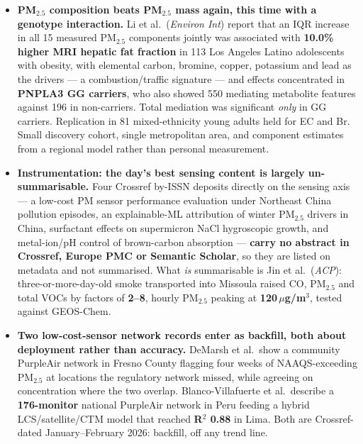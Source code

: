 \documentclass[10pt]{article}
\begin{document}
\begin{itemize}
\item \textbf{PM$_{2.5}$ composition beats PM$_{2.5}$ mass again, this time with a
genotype interaction.} Li et al.\ (\textit{Environ Int}) report that an IQR increase in
all 15 measured PM$_{2.5}$ components jointly was associated with \textbf{10.0\% higher
MRI hepatic fat fraction} in 113 Los Angeles Latino adolescents with obesity, with
elemental carbon, bromine, copper, potassium and lead as the drivers --- a
combustion/traffic signature --- and effects concentrated in \textbf{PNPLA3 GG carriers},
who also showed 550 mediating metabolite features against 196 in non-carriers. Total
mediation was significant \emph{only} in GG carriers. Replication in 81 mixed-ethnicity
young adults held for EC and Br. Small discovery cohort, single metropolitan area, and
component estimates from a regional model rather than personal measurement.

\item \textbf{Instrumentation: the day's best sensing content is largely un-summarisable.}
Four Crossref by-ISSN deposits directly on the sensing axis --- a low-cost PM sensor
performance evaluation under Northeast China pollution episodes, an explainable-ML
attribution of winter PM$_{2.5}$ drivers in China, surfactant effects on supermicron NaCl
hygroscopic growth, and metal-ion/pH control of brown-carbon absorption --- \textbf{carry
no abstract in Crossref, Europe PMC or Semantic Scholar}, so they are listed on metadata
and not summarised. What \emph{is} summarisable is Jin et al.\ (\textit{ACP}):
three-or-more-day-old smoke transported into Missoula raised CO, PM$_{2.5}$ and total VOCs
by factors of \textbf{2--8}, hourly PM$_{2.5}$ peaking at \textbf{120\,$\mu$g/m$^3$},
tested against GEOS-Chem.

\item \textbf{Two low-cost-sensor network records enter as backfill, both about deployment
rather than accuracy.} DeMarsh et al.\ show a community PurpleAir network in Fresno County
flagging four weeks of NAAQS-exceeding PM$_{2.5}$ at locations the regulatory network
missed, while agreeing on concentration where the two overlap. Blanco-Villafuerte et al.\
describe a \textbf{176-monitor} national PurpleAir network in Peru feeding a hybrid
LCS/satellite/CTM model that reached \textbf{R$^2$ 0.88} in Lima. Both are Crossref-dated
January--February 2026: backfill, off any trend line.

\end{itemize}

\clearpage
\end{document}
